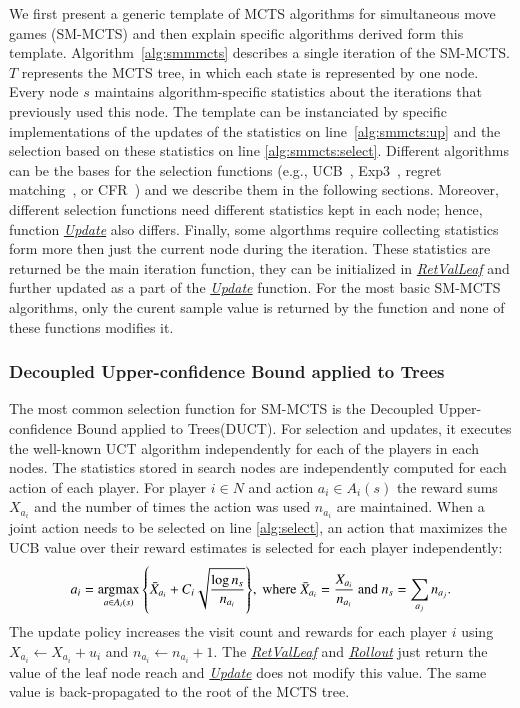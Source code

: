 We first present a generic template of MCTS algorithms for simultaneous move games (SM-MCTS) and then explain specific algorithms derived form this template. Algorithm~\ref{alg:smmmcts} describes a single iteration of the SM-MCTS. $T$ represents the MCTS tree, in which
each state is represented by one node. Every node $s$ maintains algorithm-specific statistics about the iterations that previously used this node. The template can be instanciated by specific implementations of the updates of the statistics on line~\ref{alg:smmcts:up} and the selection based on these statistics on line \ref{alg:smmcts:select}. 
Different algorithms can be the bases for the selection functions (e.g., UCB~\cite{UCB}, Exp3~\cite{Auer2003Exp3}, regret matching~\cite{Hart00}, or CFR~\cite{}) and we describe them in the following sections. 
Moreover, different selection functions need different statistics kept in each node; hence, function \emph{\underline{Update}} also differs. 
Finally, some algorthms require collecting statistics form more then just the current node during the iteration.
These statistics are returned be the main iteration function, they can be initialized in \emph{\underline{RetValLeaf}} and further updated as a part of the \emph{\underline{Update}} function.
For the most basic SM-MCTS algorithms, only the curent sample value is returned by the function and none of these functions modifies it.

\subsubsection{Decoupled Upper-confidence Bound applied to Trees}

The most common selection function for SM-MCTS is the Decoupled Upper-confidence Bound applied to Trees(DUCT). For selection and updates, it executes the well-known UCT \cite{kocsis2006} algorithm independently for each of the players in each nodes. The statistics stored in search nodes are independently computed for each action of each player. For player $i\in N$ and action $a_i \in A_i(s)$ the reward sums $X_{a_i}$ and the number of times the action was used $n_{a_i}$ are maintained. When a joint action needs to be selected on line 
\ref{alg:select}, an action that maximizes the UCB value over their reward estimates is selected for each player independently:
\[ a_i = \argmax_{a \in A_i(s)}{ \left\{ \bar{X}_{a_i} + C_i \sqrt{\frac{\log n_s}{n_{a_i}}} \right\} }, 
  \mbox{ where } \bar{X}_{a_i} = \frac{X_{a_i}}{n_{a_i}} \mbox{ and } n_s=\sum_{a_j} n_{a_j}. \] 
\noindent The update policy increases the visit count and rewards for each player $i$ using $X_{a_i} \leftarrow X_{a_i} + u_i$ 
and $n_{a_i} \leftarrow n_{a_i} + 1$. The \emph{\underline{RetValLeaf}} and  \emph{\underline{Rollout}} just return the value of the leaf node reach and  \emph{\underline{Update}} does not modify this value. The same value is back-propagated to the root of the MCTS tree.

